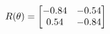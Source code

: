 \documentclass[preview]{standalone}
\begin{document}
\begin{align*}
\special{dvisvgm:raw <g id='unique000'>}R(\theta) = \begin{bmatrix}-0.84 & -0.54\\0.54 & -0.84\end{bmatrix}\special{dvisvgm:raw </g>}
\end{align*}
\end{document}
